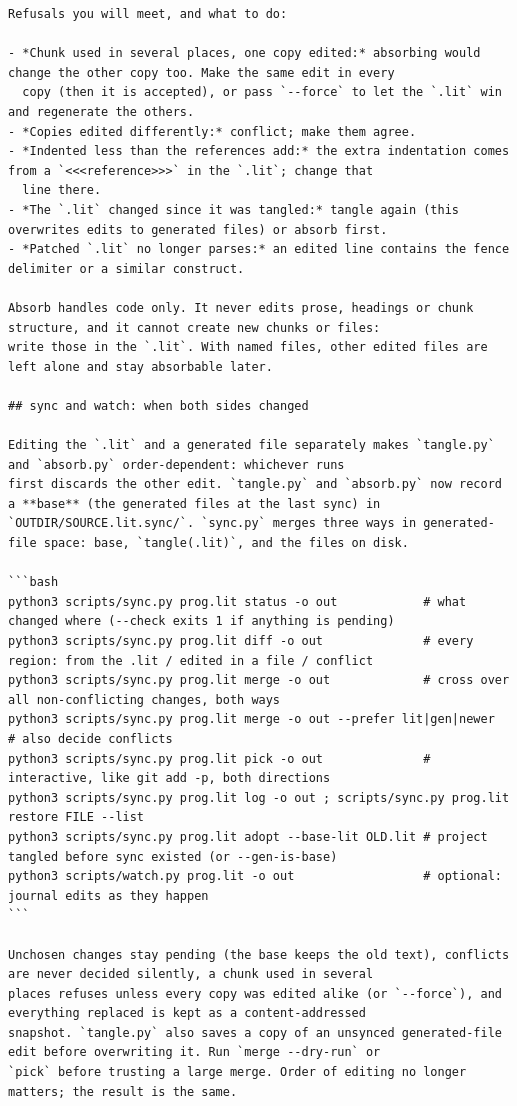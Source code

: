 \documentclass[10pt,a4paper]{article}
\newcounter{chunk}
\begin{document}
\begin{Verbatim}
Refusals you will meet, and what to do:

- *Chunk used in several places, one copy edited:* absorbing would change the other copy too. Make the same edit in every
  copy (then it is accepted), or pass `--force` to let the `.lit` win and regenerate the others.
- *Copies edited differently:* conflict; make them agree.
- *Indented less than the references add:* the extra indentation comes from a `<<<reference>>>` in the `.lit`; change that
  line there.
- *The `.lit` changed since it was tangled:* tangle again (this overwrites edits to generated files) or absorb first.
- *Patched `.lit` no longer parses:* an edited line contains the fence delimiter or a similar construct.

Absorb handles code only. It never edits prose, headings or chunk structure, and it cannot create new chunks or files:
write those in the `.lit`. With named files, other edited files are left alone and stay absorbable later.

## sync and watch: when both sides changed

Editing the `.lit` and a generated file separately makes `tangle.py` and `absorb.py` order-dependent: whichever runs
first discards the other edit. `tangle.py` and `absorb.py` now record a **base** (the generated files at the last sync) in
`OUTDIR/SOURCE.lit.sync/`. `sync.py` merges three ways in generated-file space: base, `tangle(.lit)`, and the files on disk.

```bash
python3 scripts/sync.py prog.lit status -o out            # what changed where (--check exits 1 if anything is pending)
python3 scripts/sync.py prog.lit diff -o out              # every region: from the .lit / edited in a file / conflict
python3 scripts/sync.py prog.lit merge -o out             # cross over all non-conflicting changes, both ways
python3 scripts/sync.py prog.lit merge -o out --prefer lit|gen|newer    # also decide conflicts
python3 scripts/sync.py prog.lit pick -o out              # interactive, like git add -p, both directions
python3 scripts/sync.py prog.lit log -o out ; scripts/sync.py prog.lit restore FILE --list
python3 scripts/sync.py prog.lit adopt --base-lit OLD.lit # project tangled before sync existed (or --gen-is-base)
python3 scripts/watch.py prog.lit -o out                  # optional: journal edits as they happen
```

Unchosen changes stay pending (the base keeps the old text), conflicts are never decided silently, a chunk used in several
places refuses unless every copy was edited alike (or `--force`), and everything replaced is kept as a content-addressed
snapshot. `tangle.py` also saves a copy of an unsynced generated-file edit before overwriting it. Run `merge --dry-run` or
`pick` before trusting a large merge. Order of editing no longer matters; the result is the same.


\end{Verbatim}
\end{document}
